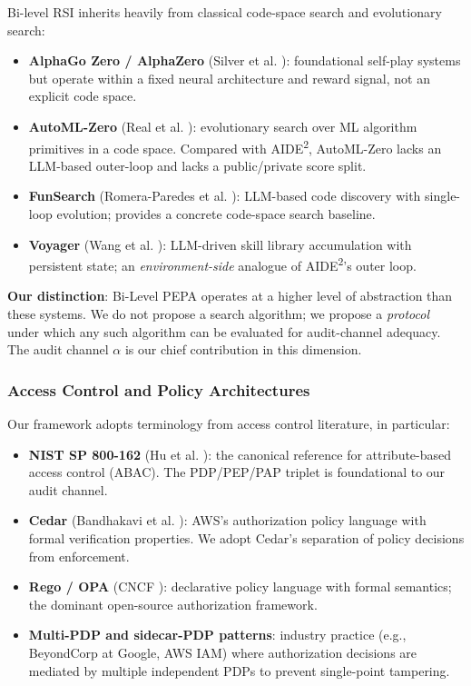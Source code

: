 Bi-level RSI inherits heavily from classical code-space search and evolutionary search:
\begin{itemize}
    \item \textbf{AlphaGo Zero / AlphaZero} (Silver et al. \cite{silver2017mastering, silver2018alphazero}): foundational self-play systems but operate within a fixed neural architecture and reward signal, not an explicit code space.
    \item \textbf{AutoML-Zero} (Real et al. \cite{real2020automl}): evolutionary search over ML algorithm primitives in a code space. Compared with AIDE\textsuperscript{2}, AutoML-Zero lacks an LLM-based outer-loop and lacks a public/private score split.
    \item \textbf{FunSearch} (Romera-Paredes et al. \cite{romeraparedes2023mathematical}): LLM-based code discovery with single-loop evolution; provides a concrete code-space search baseline.
    \item \textbf{Voyager} (Wang et al. \cite{wang2023voyager}): LLM-driven skill library accumulation with persistent state; an \emph{environment-side} analogue of AIDE\textsuperscript{2}'s outer loop.
\end{itemize}

\textbf{Our distinction}: Bi-Level PEPA operates at a higher level of abstraction than these systems. We do not propose a search algorithm; we propose a \emph{protocol} under which any such algorithm can be evaluated for audit-channel adequacy. The audit channel $\alpha$ is our chief contribution in this dimension.

\subsubsection{Access Control and Policy Architectures}

Our framework adopts terminology from access control literature, in particular:
\begin{itemize}
    \item \textbf{NIST SP 800-162} (Hu et al. \cite{nist2014abac}): the canonical reference for attribute-based access control (ABAC). The PDP/PEP/PAP triplet is foundational to our audit channel.
    \item \textbf{Cedar} (Bandhakavi et al. \cite{bandhakavi2008cedar}): AWS's authorization policy language with formal verification properties. We adopt Cedar's separation of policy decisions from enforcement.
    \item \textbf{Rego / OPA} (CNCF \cite{cncf2021opa}): declarative policy language with formal semantics; the dominant open-source authorization framework.
    \item \textbf{Multi-PDP and sidecar-PDP patterns}: industry practice (e.g., BeyondCorp at Google, AWS IAM) where authorization decisions are mediated by multiple independent PDPs to prevent single-point tampering.
\end{itemize}

